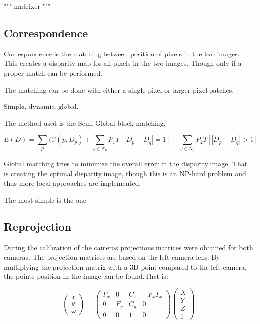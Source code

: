 """ matrixer """

\subsection{Correspondence}

Correspondence is the matching between position of pixels in the two images. This creates a disparity map for all pixels in the two images. Though only if a proper match can be performed.

The matching can be done with either a single pixel or larger pixel patches.

Simple, dynamic, global.

The method used is the Semi-Global block matching.

\[ E(D) = \sum\limits_{p}(C(p,D_{p}) + \sum\limits_{q \in N_{p} } P_{1} T [|D_{p} - D_{q}| = 1] + \sum\limits_{q \in N_{p} } P_{2} T [|D_{p} - D_{q}| > 1] \]

Global matching tries to minimize the overall error in the disparity image. That is creating the optimal disparity image, though this is an NP-hard problem and thus more local approaches are implemented. 

The most simple is the one 

\subsection{Reprojection}

During the calibration of the cameras projections matrices were obtained for both cameras. The projection matrices are based on the left camera lens. By multiplying the projection matrix with a 3D point compared to the left camera, the points position in the image can be found.That is:

\[ 
\begin{pmatrix}
  x \\
  y \\
  \omega 
 \end{pmatrix}	
 = 
 \begin{pmatrix}
  F_{x} & 0 & C_{x} & -F_{x}T_{x} \\
  0 & F_{y} & C_{y} & 0 \\
  0 & 0 & 1 & 0
 \end{pmatrix}
 \begin{pmatrix}
  X \\
  Y \\
  Z \\
  1 
 \end{pmatrix}	
\]

